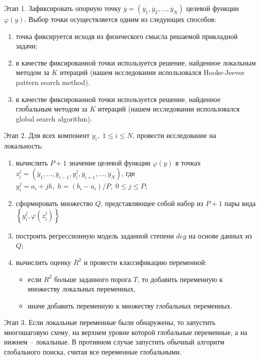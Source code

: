 \documentclass{aip-cp}
\begin{document}
Этап 1. Зафиксировать опорную точку $\overline{y} = (\overline{y}_1, \overline{y}_2,...,\overline{y}_N)$ целевой функции $\varphi(y)$. Выбор точки осуществляется одним из следующих способов:
\begin{enumerate}
\item точка фиксируется исходя из физического смысла решаемой прикладной задачи;
\item в качестве фиксированной точки используется решение, найденное локальным методом за $K$ итераций (нашем исследовании использовался Hooke-Jeevse pattern search method).
\item в качестве фиксированной точки используется решение, найденное глобальным методом за $K$ итераций (нашем исследовании использовался global search algorithm).
\end{enumerate}

Этап 2. Для всех компонент $y_i, \; 1\leq i \leq N$, провести исследование на локальность:
\begin{enumerate}
\item вычислить $P+1$ значение целевой функции $\varphi(y)$ в точках $z_i^j = (\overline{y}_1,...,\overline{y}_{i-1},y_i^j,\overline{y}_{i+1},...,\overline{y}_N)$, где
$y_i^j =  a_i + jh, \; h=(b_i-a_i)/P, \; 0\leq j \leq P$;
\item сформировать множество $Q$, представляющее собой набор из $P+1$ пары вида $\left\{y_i^j, \varphi(z_i^j)\right\} $ 
\item построить регрессионную модель заданной степени $deg$ на основе данных из $Q$;
\item вычислить оценку $R^2$ и провести классификацию переменной:
\begin{itemize}
\item если $R^2$ больше заданного порога $T$, то добавить переменную к множеству локальных переменных,
\item иначе добавить переменную к множеству глобальных переменных.
\end{itemize}
\end{enumerate}

Этап 3. Если локальные переменные были обнаружены, то запустить многошаговую схему, на верхнем уровне которой глобальные переменные, а на нижнем -- локальные. В противном случае запустить обычный алгоритм глобального поиска, считая все переменные глобальными.
\end{document}
